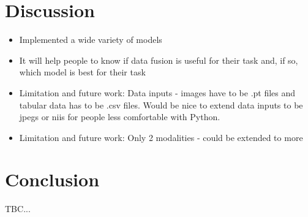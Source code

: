 \section{Discussion}
\begin{itemize}
    \item Implemented a wide variety of models
    \item It will help people to know if data fusion is useful for their task and, if so, which model is best for their task
    \item Limitation and future work: Data inputs - images have to be .pt files and tabular data has to be .csv files. Would be nice to extend data inputs to be jpegs or niis for people less comfortable with Python.
    \item Limitation and future work: Only 2 modalities - could be extended to more
\end{itemize}

\section{Conclusion}
TBC...

